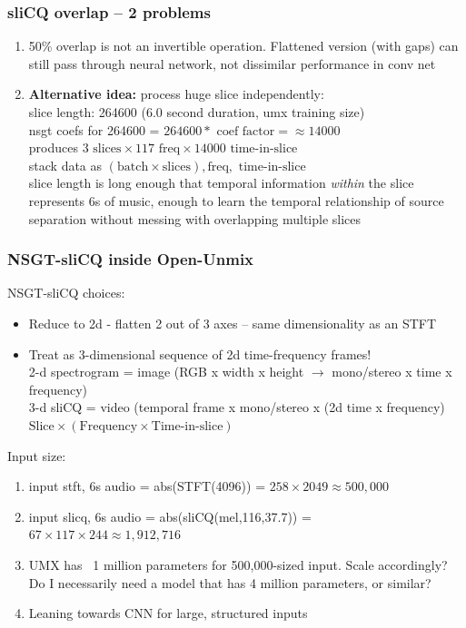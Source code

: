 \documentclass[usenames,dvipsnames]{beamer}
\begin{document}
\begin{frame}
	\frametitle{sliCQ overlap -- 2 problems}
	\begin{enumerate}
		\item
			50\% overlap is not an invertible operation. Flattened version (with gaps) can still pass through neural network, not dissimilar performance in conv net
		\item
			\textbf{Alternative idea:} process huge slice independently:\\
			slice length: 264600 (6.0 second duration, umx training size)\\
			nsgt coefs for 264600 = $264600 * \text{ coef factor} = \approx 14000$\\
			produces $3 \text{ slices} \times 117 \text{ freq} \times 14000 \text{ time-in-slice}$\\
			stack data as $(\text{batch} \times \text{slices}), \text{freq}, \text { time-in-slice}$\\
			slice length is long enough that temporal information \textit{within} the slice represents 6s of music, enough to learn the temporal relationship of source separation without messing with overlapping multiple slices
	\end{enumerate}
\end{frame}

\begin{frame}
	\frametitle{NSGT-sliCQ inside Open-Unmix}
	NSGT-sliCQ choices:
	\begin{itemize}
		\item
			Reduce to 2d - flatten 2 out of 3 axes -- same dimensionality as an STFT
		\item
			Treat as 3-dimensional sequence of 2d time-frequency frames!\\
			2-d spectrogram = image (RGB x width x height $\rightarrow$ mono/stereo x time x frequency)\\
			3-d sliCQ = video (temporal frame x mono/stereo x (2d time x frequency)\\
			$\text{Slice} \times (\text{Frequency} \times \text{Time-in-slice})$
	\end{itemize}
	Input size:
	\begin{enumerate}
		\item
			input stft, 6s audio = abs(STFT(4096)) = $258 \times 2049 \approx 500,000$
		\item
			input slicq, 6s audio = abs(sliCQ(mel,116,37.7)) = $67 \times 117 \times 244 \approx 1,912,716$
		\item
			UMX has ~1 million parameters for 500,000-sized input. Scale accordingly? Do I necessarily need a model that has 4 million parameters, or similar?
		\item
			Leaning towards CNN for large, structured inputs
	\end{enumerate}
\end{frame}
\end{document}
